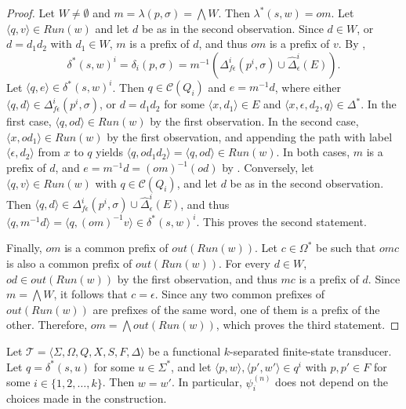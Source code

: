 \begin{proof}
  Let $W \neq \emptyset$ and $m = \lambda(p, \sigma) = \bigwedge W$. Then
  $\lambda^*(s, w) = om$. Let $\langle q, v \rangle \in Run(w)$ and let $d$ be as in
  the second observation. Since $d \in W$, or $d = d_1d_2$ with $d_1 \in W$, $m$ is a
  prefix of $d$, and thus $om$ is a prefix of $v$. By ,
  \begin{equation*}
    \delta^*(s, w)^i = \delta_i(p, \sigma) = m^{-1}(\Delta_{f\epsilon}^i(p^i, \sigma)
    \cup \hat{\Delta}_\epsilon^i(E)).
  \end{equation*}
  Let $\langle q, e \rangle \in \delta^*(s, w)^i$. Then $q \in \mathcal{C}(Q_i)$ and
  $e = m^{-1}d$, where either $\langle q, d \rangle \in \Delta_{f\epsilon}^i(p^i,
  \sigma)$, or $d = d_1 d_2$ for some $\langle x, d_1 \rangle \in E$ and $\langle x,
  \epsilon, d_2, q \rangle \in \Delta^*$. In the first case, $\langle q, od \rangle
  \in Run(w)$ by the first observation. In the second case, $\langle x, od_1 \rangle
  \in Run(w)$ by the first observation, and appending the path with label $\langle
  \epsilon, d_2 \rangle$ from $x$ to $q$ yields $\langle q, od_1d_2 \rangle = \langle
  q, od \rangle \in Run(w)$. In both cases, $m$ is a prefix of $d$, and $e = m^{-1}d =
  (om)^{-1}(od)$ by . Conversely, let $\langle q, v \rangle \in
  Run(w)$ with $q \in \mathcal{C}(Q_i)$, and let $d$ be as in the second observation.
  Then $\langle q, d \rangle \in \Delta_{f\epsilon}^i(p^i, \sigma) \cup
  \hat{\Delta}_\epsilon^i(E)$, and thus $\langle q, m^{-1}d \rangle = \langle q,
  (om)^{-1}v \rangle \in \delta^*(s, w)^i$. This proves the second statement.

  Finally, $om$ is a common prefix of $out(Run(w))$. Let $c \in \Omega^*$ be such that
  $omc$ is also a common prefix of $out(Run(w))$. For every $d \in W$, $od \in
  out(Run(w))$ by the first observation, and thus $mc$ is a prefix of $d$. Since $m =
  \bigwedge W$, it follows that $c = \epsilon$. Since any two common prefixes of
  $out(Run(w))$ are prefixes of the same word, one of them is a prefix of the other.
  Therefore, $om = \bigwedge out(Run(w))$, which proves the third statement.
\end{proof}

\begin{proposition}\label{prop:quasisubseq_psi}
  Let $\mathcal{T} = \langle \Sigma, \Omega, Q, X, S, F, \Delta \rangle$ be a
  functional $k$-separated finite-state transducer. Let $q = \delta^*(s, u)$ for some
  $u \in \Sigma^*$, and let $\langle p, w \rangle, \langle p', w' \rangle \in q^i$ with
  $p, p' \in F$ for some $i \in \{ 1, 2, \ldots, k \}$. Then $w = w'$. In particular,
  $\psi_i^{(n)}$ does not depend on the choices made in the construction.
\end{proposition}

